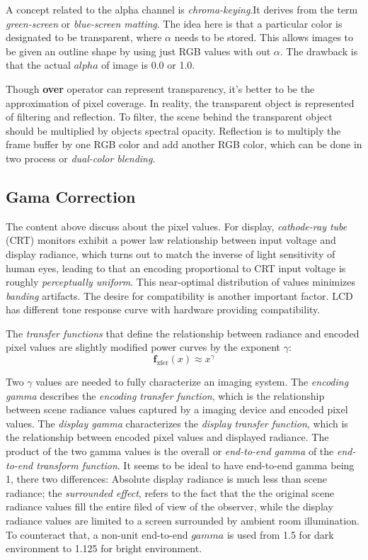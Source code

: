 \documentclass[10pt, a4paper]{article}
\begin{document}
            A concept related to the alpha channel is \emph{chroma-keying}.It derives from the term \emph{green-screen} or \emph{blue-screen matting}. The idea here is that a particular color is designated to be transparent, where $\alpha$ needs to be stored. This allows images to be given an outline shape by using just RGB values with out $\alpha$. The drawback is that the actual $alpha$ of image is 0.0 or 1.0. 

            Though \textbf{over} operator can represent transparency, it's better to be the approximation of pixel coverage. In reality, the transparent object is represented of filtering and reflection. To filter, the scene behind the transparent object should be multiplied by objects spectral opacity. Reflection is to multiply the frame buffer by one RGB color and add another RGB color, which can be done in two process or \emph{dual-color blending}. 
            
        \subsection{Gama Correction}
            The content above discuss about the pixel values. For display, \emph{cathode-ray tube} (CRT) monitors exhibit a power law relationship between input voltage and display radiance, which turns out to match the inverse of light sensitivity of human eyes, leading to that an encoding proportional to CRT input voltage is roughly \emph{perceptually uniform}. This near-optimal distribution of values minimizes \emph{banding} artifacts. The desire for compatibility is another important factor. LCD has different tone response curve with hardware providing compatibility. 

            The \emph{transfer functions} that define the relationship between radiance and encoded pixel values are slightly modified power curves by the exponent $\gamma$:
                $$\textbf{f}_{\text{xfer}}(x) \approx x^{\gamma}$$
            
            Two $\gamma$ values are needed to fully characterize an imaging system. The \emph{encoding gamma} describes the \emph{encoding transfer function}, which is the relationship between scene radiance values captured by a imaging device and encoded pixel values. The \emph{display gamma} characterizes the \emph{display transfer function}, which is the relationship between encoded pixel values and displayed radiance. The product of the two gamma values is the overall or \emph{end-to-end gamma} of the \emph{end-to-end transform function}. It seems to be ideal to have end-to-end gamma being 1, there two differences: Absolute display radiance is much less than scene radiance; the \emph{surrounded effect}, refers to the fact that the the original scene radiance values fill the entire filed of view of the observer, while the display radiance values are limited to a screen surrounded by ambient room illumination. To counteract that, a non-unit end-to-end $gamma$ is used from 1.5 for dark environment to 1.125 for bright environment. 
\end{document}
